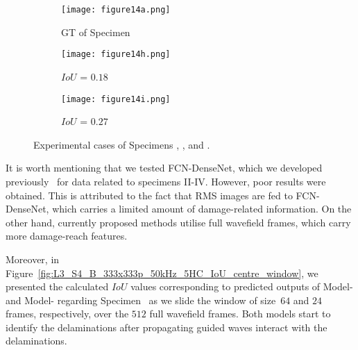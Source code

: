 \begin{figure} [!h]
\begin{subfigure}[b]{0.32\textwidth}
		\label{fig:L3_S3_B_ijjeh}
	\end{subfigure}
	\par\medskip
	\begin{subfigure}[b]{0.32\textwidth}
		\centering
		\texttt{[image: figure14a.png]}
		\caption{\centering GT of Specimen~}
		\label{fig:gt_specimen_4}
	\end{subfigure}
	\hfill
	\begin{subfigure}[b]{0.32\textwidth}
		\centering
		\texttt{[image: figure14h.png]}
		\caption{\centering \(IoU\) = \(0.18\)}  
		\label{fig:L3_S4_B_saeed}
	\end{subfigure}
	\hfill
	\begin{subfigure}[b]{0.32\textwidth}
		\centering
		\texttt{[image: figure14i.png]}
		\caption{\centering \(IoU\) = \(0.27\)} 
		\label{fig:L3_S4_B_ijjeh}
	\end{subfigure}
	\caption{Experimental cases of Specimens , , and .}
	\label{fig:exp_case}
\end{figure} 
\twocolumn

It is worth mentioning that we tested FCN-DenseNet, which we developed previously~\cite{Ijjeh2021} for data related to specimens II-IV. 
However, poor results were obtained. 
This is attributed to the fact that RMS images are fed to FCN-DenseNet, which carries a limited amount of damage-related information. 
On the other hand, currently proposed methods utilise full wavefield frames, which carry more damage-reach features. 

Moreover, in Figure~\ref{fig:L3_S4_B_333x333p_50kHz_5HC_IoU_centre_window}, we 
presented the calculated \(IoU\) values corresponding to predicted outputs of 
Model- and Model- regarding Specimen~ as we slide the 
window of size~\(64\) and \(24\) frames, respectively, over the \(512\) full 
wavefield frames.
Both models start to identify the delaminations after propagating guided waves interact with the delaminations.

